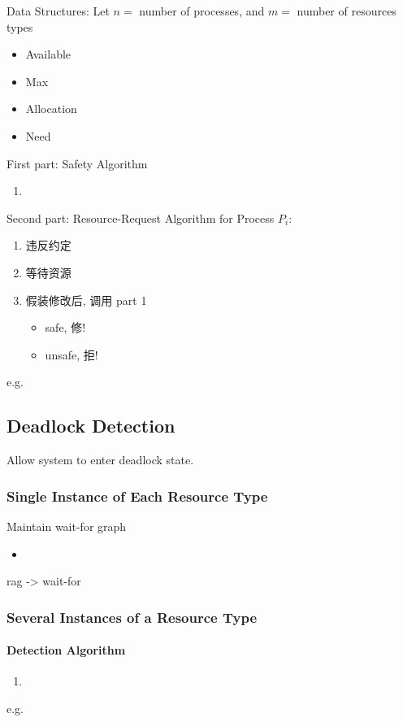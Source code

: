 Data Structures: Let $n =$ number of processes, and $m =$ number of resources types
\begin{itemize}
    \item Available
    \item Max
    \item Allocation
    \item Need
\end{itemize}

First part: Safety Algorithm
\begin{enumerate}
    \item 
\end{enumerate}

Second part: Resource-Request Algorithm for Process $P_i$:
\begin{enumerate}
    \item 违反约定
    \item 等待资源
    \item 假装修改后, 调用 part 1
    \begin{itemize}
        \item safe, 修!
        \item unsafe, 拒!
    \end{itemize}
\end{enumerate}

e.g. %

\subsection{Deadlock Detection}
Allow system to enter deadlock state. 
\subsubsection{Single Instance of Each Resource Type}
Maintain wait-for graph
\begin{itemize}
    \item 
\end{itemize}

rag -> wait-for

\subsubsection{Several Instances of a Resource Type}


\paragraph{Detection Algorithm}
\begin{enumerate}
    \item 
\end{enumerate}

e.g. 

